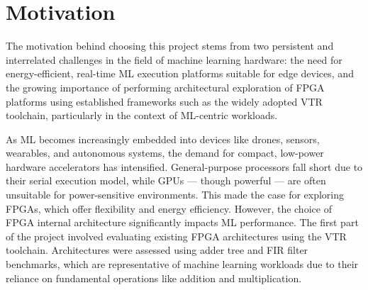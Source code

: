 \section[Motivation]{\textbf{Motivation}}
The motivation behind choosing this project stems from two persistent and interrelated challenges in the field of machine learning hardware: the need for energy-efficient, real-time ML execution platforms suitable for edge devices, and the growing importance of performing architectural exploration of FPGA platforms using established frameworks such as the widely adopted VTR toolchain, particularly in the context of ML-centric workloads.

As ML becomes increasingly embedded into devices like drones, sensors, wearables, and autonomous systems, the demand for compact, low-power hardware accelerators has intensified. General-purpose processors fall short due to their serial execution model, while GPUs — though powerful — are often unsuitable for power-sensitive environments. This made the case for exploring FPGAs, which offer flexibility and energy efficiency. However, the choice of FPGA internal architecture significantly impacts ML performance. The first part of the project involved evaluating existing FPGA architectures using the VTR toolchain. Architectures were assessed using adder tree and FIR filter benchmarks, which are representative of machine learning workloads due to their reliance on fundamental operations like addition and multiplication.

